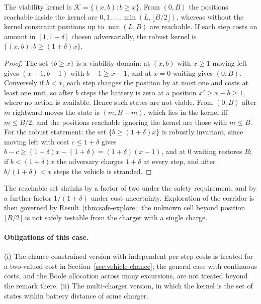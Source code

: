 \begin{newresult}\label{prop:robot}
The viability kernel is $\mathcal K=\{(x,b):b\ge x\}$. From $(0,B)$ the positions reachable inside the kernel are $0,1,\dots,\min(L,\lfloor B/2\rfloor)$, whereas without the kernel constraint positions up to $\min(L,B)$ are reachable. If each step costs an amount in $[1,1+\delta]$ chosen adversarially, the robust kernel is $\{(x,b):b\ge(1+\delta)x\}$.
\end{newresult}
\begin{proof}
The set $\{b\ge x\}$ is a viability domain: at $(x,b)$ with $x\ge1$ moving left gives $(x-1,b-1)$ with $b-1\ge x-1$, and at $x=0$ waiting gives $(0,B)$. Conversely if $b<x$, each step changes the position by at most one and costs at least one unit, so after $b$ steps the battery is zero at a position $x'\ge x-b\ge1$, where no action is available. Hence such states are not viable. From $(0,B)$ after $m$ rightward moves the state is $(m,B-m)$, which lies in the kernel iff $m\le B/2$, and the positions reachable ignoring the kernel are those with $m\le B$. For the robust statement: the set $\{b\ge(1+\delta)x\}$ is robustly invariant, since moving left with cost $c\le1+\delta$ gives $b-c\ge(1+\delta)x-(1+\delta)=(1+\delta)(x-1)$, and at $0$ waiting restores $B$; if $b<(1+\delta)x$ the adversary charges $1+\delta$ at every step, and after $b/(1+\delta)<x$ steps the vehicle is stranded.
\end{proof}

The reachable set shrinks by a factor of two under the safety requirement, and by a further factor $1/(1+\delta)$ under cost uncertainty. Exploration of the corridor is then governed by Result~\ref{thm:safe-explore}: the unknown cell beyond position $\lfloor B/2\rfloor$ is not safely testable from the charger with a single charge.

\paragraph{Obligations of this case.} (i) The chance-constrained version with independent per-step costs is treated for a two-valued cost in Section~\ref{sec:vehicle-chance}; the general case with continuous costs, and the Boole allocation across many excursions, are not treated beyond the remark there. (ii) The multi-charger version, in which the kernel is the set of states within battery distance of some charger.

